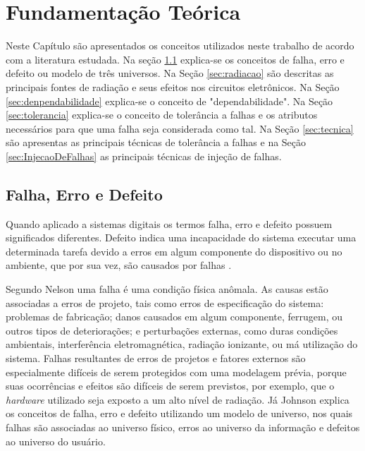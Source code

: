 
\chapter{Fundamentação Teórica}\label{cap:funTeorica}

Neste Capítulo são apresentados os conceitos utilizados neste trabalho de acordo com a literatura estudada. Na seção \ref{sec:falhaErroDefeito} explica-se os conceitos de falha, erro e defeito ou modelo de três universos. Na Seção \ref{sec:radiacao} são descritas as principais fontes de radiação e seus efeitos nos circuitos eletrônicos. Na Seção \ref{sec:denpendabilidade} explica-se o conceito de "dependabilidade". Na Seção \ref{sec:tolerancia} explica-se o conceito de tolerância a falhas e os atributos necessários para que uma falha seja considerada como tal. Na Seção \ref{sec:tecnica} são apresentas as principais técnicas de tolerância a falhas e na Seção \ref{sec:InjecaoDeFalhas} as principais técnicas de injeção de falhas.

\section{Falha, Erro e Defeito} \label{sec:falhaErroDefeito}

Quando aplicado a sistemas digitais os termos falha, erro e defeito possuem significados diferentes. Defeito indica uma incapacidade do sistema executar uma determinada tarefa devido a erros em algum componente do dispositivo ou no ambiente, que por sua vez, são causados por falhas \cite{Nelson:1990}.

Segundo Nelson \cite{Nelson:1990} uma falha é uma condição física anômala. As causas estão associadas a erros de projeto, tais como erros de especificação do sistema: problemas de fabricação; danos causados em algum componente, ferrugem, ou outros tipos de deteriorações; e perturbações externas, como duras condições ambientais, interferência eletromagnética, radiação ionizante, ou má utilização do sistema. Falhas resultantes de erros de projetos e fatores externos são especialmente difíceis de serem protegidos com uma modelagem prévia, porque suas ocorrências e efeitos são difíceis de serem previstos, por exemplo, que o \textit{hardware} utilizado seja exposto a um alto nível de radiação. Já Johnson \cite{Johnson:1984} explica os conceitos de falha, erro e defeito utilizando um modelo de universo, nos quais falhas são associadas ao universo físico, erros ao universo da informação e defeitos ao universo do usuário. 

